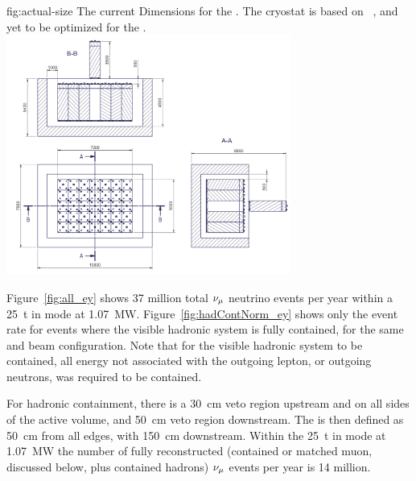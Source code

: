 \begin{dunefigure}{fig:actual-size}
{The current  Dimensions for the   . The cryostat is based on ~\cite{Abi:2017aow}, and yet to be optimized for the   .}
	\includegraphics[width=0.7\textwidth]{graphics/actual-size.png}
\end{dunefigure}

\label{sec:appx-nd::rates}

Figure~\ref{fig:all_ey} shows 37 million total  $\nu_\mu$ neutrino events per year within a \SI{25}{\tonne}  in  mode at \SI{1.07}{\mega\watt}. Figure~\ref{fig:hadContNorm_ey} shows only the event rate for events where the visible hadronic system is fully contained, for the same  and beam configuration. Note that for the visible hadronic system to be contained, all energy not associated with the outgoing lepton, or outgoing neutrons, was required to be contained. 


For hadronic containment, there is a \SI{30}{\centi\metre} veto region upstream and on all sides of the active volume, and \SI{50}{\centi\metre} veto region downstream. The  is then defined as \SI{50}{\centi\metre} from all edges, with \SI{150}{\centi\metre} downstream.  Within the \SI{25}{\tonne}  in  mode at \SI{1.07}{\mega\watt} the number of fully reconstructed (contained or matched muon, discussed below, plus contained hadrons)  $\nu_\mu$ events per year is 14 million.   


